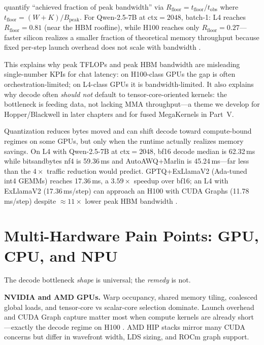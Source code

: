 \citet{memoryfloor2026} quantify ``achieved fraction of peak bandwidth'' via $R_{\mathrm{floor}}=t_{\mathrm{floor}}/t_{\mathrm{obs}}$ where $t_{\mathrm{floor}}=(W+K)/B_{\mathrm{peak}}$.
For Qwen-2.5-7B at ctx${=}2048$, batch-1: L4 reaches $R_{\mathrm{floor}}{=}0.81$ (near the HBM roofline), while H100 reaches only $R_{\mathrm{floor}}{=}0.27$---faster silicon realizes a smaller fraction of theoretical memory throughput because fixed per-step launch overhead does not scale with bandwidth \citep{memoryfloor2026}.

This explains why peak TFLOPs and peak HBM bandwidth are misleading single-number KPIs for chat latency: on H100-class GPUs the gap is often orchestration-limited; on L4-class GPUs it is bandwidth-limited.
It also explains why decode often \emph{should not} default to tensor-core-oriented kernels: the bottleneck is feeding data, not lacking MMA throughput---a theme we develop for Hopper/Blackwell in later chapters and for fused MegaKernels in Part~V.

Quantization reduces bytes moved and can shift decode toward compute-bound regimes on some GPUs, but only when the runtime actually realizes memory savings.
On L4 with Qwen-2.5-7B at ctx${=}2048$, bf16 decode median is 62.32\,ms while bitsandbytes nf4 is 59.36\,ms and AutoAWQ+Marlin is 45.24\,ms---far less than the $4\times$ traffic reduction would predict.
GPTQ+ExLlamaV2 (Ada-tuned int4 GEMMs) reaches 17.36\,ms, a $3.59\times$ speedup over bf16; an L4 with ExLlamaV2 (17.36\,ms/step) can approach an H100 with CUDA Graphs (11.78\,ms/step) despite ${\approx}11\times$ lower peak HBM bandwidth \citep{memoryfloor2026}.

\section{Multi-Hardware Pain Points: GPU, CPU, and NPU}
\label{sec:multi_hardware}

The decode bottleneck \emph{shape} is universal; the \emph{remedy} is not.

\textbf{NVIDIA and AMD GPUs.} Warp occupancy, shared memory tiling, coalesced global loads, and tensor-core vs scalar-core selection dominate.
Launch overhead and CUDA Graph capture matter most when compute kernels are already short---exactly the decode regime on H100 \citep{memoryfloor2026,taxbreak2026}.
AMD HIP stacks mirror many CUDA concerns but differ in wavefront width, LDS sizing, and ROCm graph support.

